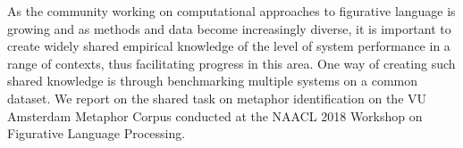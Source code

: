 As the community working on computational approaches to figurative language is growing and as methods and data become increasingly diverse, it is important to create widely shared empirical knowledge of the level of system performance in a range of contexts, thus facilitating progress in this area. One way of creating such shared knowledge is through benchmarking multiple systems on a common dataset. We report on the shared task on metaphor identification on the VU Amsterdam Metaphor Corpus conducted at the NAACL 2018 Workshop on Figurative Language Processing.
